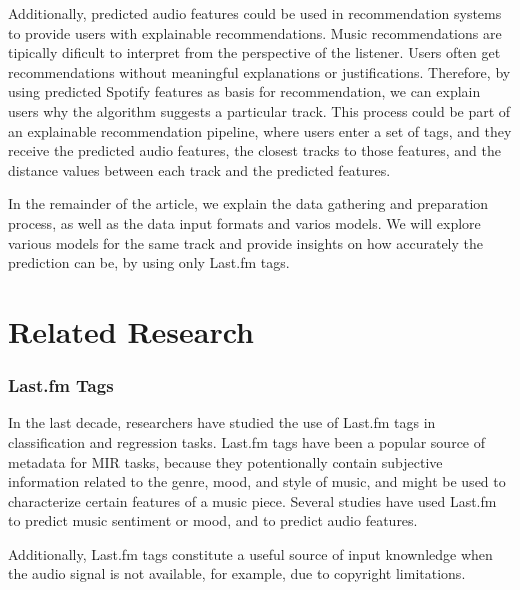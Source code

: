 \documentclass[sn-mathphys]{sn-jnl}%
\theoremstyle{thmstyleone}%
\theoremstyle{thmstyletwo}%
\theoremstyle{thmstylethree}%
\begin{document}
Additionally, predicted audio features could be used in recommendation systems to provide users with explainable recommendations.
Music recommendations are tipically dificult to interpret from the perspective of the listener.
Users often get recommendations without meaningful explanations or justifications.
Therefore, by using predicted Spotify features as basis for recommendation, we can explain users why the algorithm suggests a particular track.
This process could be part of an explainable recommendation pipeline, where users enter a set of tags,
and they receive the predicted audio features, the closest tracks to those features, and the distance values between each track and the predicted features.


In the remainder of the article, we explain the data gathering and preparation process, as well as the data input formats and varios models.
We will explore various models for the same track and provide insights on how accurately the prediction can be, by using only Last.fm tags.

\section{Related Research}

\subsubsection{Last.fm Tags}

In the last decade, researchers have studied the use of Last.fm tags in classification and regression tasks.
Last.fm tags have been a popular source of metadata for MIR tasks,
because they potentionally contain subjective information related to the genre, mood, and style of music,
and might be used to characterize certain features of a music piece.
Several studies have used Last.fm to predict music sentiment or mood, and to predict audio features.

Additionally, Last.fm tags constitute a useful source of input knownledge when the audio signal is not available,
for example, due to copyright limitations.
\end{document}
